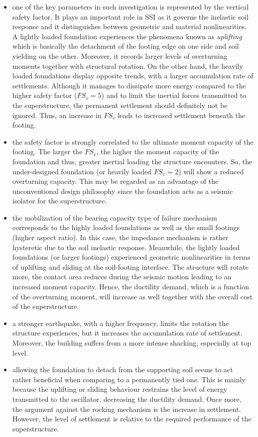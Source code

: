 \begin{itemize} 
	\item one of the key parameters in such investigation is represented by the vertical safety factor. It plays an important role in SSI as it governs the inelastic soil response and it distinguishes between geometric and material nonlinearities. A lightly loaded foundation experiences the phenomena known as \textit{uplifting} which is basically the detachment of the footing edge on one side and soil yielding on the other. Moreover, it records larger levels of overturning moments together with structural rotation. On the other hand, the heavily loaded foundations display opposite trends, with a larger accumulation rate of settlements. Although it manages to dissipate more energy compared to the higher safety factor ($FS_v=5$) and to limit the inertial forces transmitted to the superstructure, the permanent settlement should definitely not be ignored. Thus, an increase in $FS_v$ leads to increased settlement beneath the footing.
	\item the safety factor is strongly correlated to the ultimate moment capacity of the footing. The larger the $FS_v$, the higher the moment capacity of the foundation and thus, greater inertial loading the structure encounters. So, the under-designed foundation (or heavily loaded $FS_v=2$) will show a reduced overturning capacity. This may be regarded as an advantage of the unconventional design philosophy since the foundation acts as a seismic isolator for the superstructure.
	\item the mobilization of the bearing capacity type of failure mechanism corresponds to the highly loaded foundations as well as the small footings (higher aspect ratio). In this case, the impedance mechanism is rather hysteretic due to the soil inelastic response. Meanwhile, the lightly loaded foundations (or larger footings) experienced geometric nonlinearities in terms of uplifting and sliding at the soil-footing interface. The structure will rotate more, the contact area reduces during the seismic motion leading to an increased moment capacity. Hence, the ductility demand, which is a function of the overturning moment, will increase as well together with the overall cost of the superstructure.
	\item a stronger earthquake, with a higher frequency, limits the rotation the structure experiences, but it increases the accumulation rate of settlement. Moreover, the building suffers from a more intense shacking, especially at top level. 
	\item allowing the foundation to detach from the supporting soil seems to act rather beneficial when comparing to a permanently tied one. This is mainly because the uplifting or sliding behaviour restrains the level of energy transmitted to the oscillator, decreasing the ductility demand. Once more, the argument against the rocking mechanism is the increase in settlement. However, the level of settlement is relative to the required performance of the superstructure.

\end{itemize}
